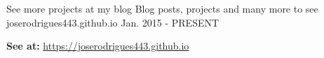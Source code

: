 \begin{cventries}

  \cventry
    {See more projects at my blog} %
    {Blog posts, projects and many more to see} %
    {joserodrigues443.github.io} %
    {Jan. 2015 - PRESENT} %
    {
      \begin{cvitems} %
        \item {\textbf{See at:} \url{https://joserodrigues443.github.io}}
      \end{cvitems}
    }




\end{cventries}


